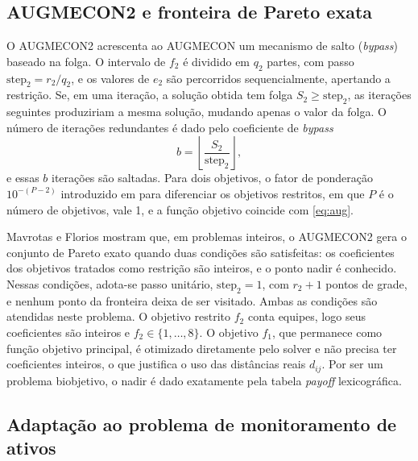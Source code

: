 \documentclass[conference]{IEEEtran}
\begin{document}
\subsection{AUGMECON2 e fronteira de Pareto exata}
\label{sec:augmecon2}

O AUGMECON2 \cite{mavrotas2013} acrescenta ao AUGMECON um mecanismo de salto (\textit{bypass}) baseado na folga. O intervalo de $f_2$ é dividido em $q_2$ partes, com passo $\text{step}_2 = r_2/q_2$, e os valores de $e_2$ são percorridos sequencialmente, apertando a restrição. Se, em uma iteração, a solução obtida tem folga $S_2 \ge \text{step}_2$, as iterações seguintes produziriam a mesma solução, mudando apenas o valor da folga. O número de iterações redundantes é dado pelo coeficiente de \textit{bypass}
\begin{equation}
b = \left\lfloor \frac{S_2}{\text{step}_2} \right\rfloor,
\label{eq:bypass}
\end{equation}
e essas $b$ iterações são saltadas. Para dois objetivos, o fator de ponderação $10^{-(P-2)}$ introduzido em \cite{mavrotas2013} para diferenciar os objetivos restritos, em que $P$ é o número de objetivos, vale 1, e a função objetivo coincide com \eqref{eq:aug}.

Mavrotas e Florios \cite{mavrotas2013} mostram que, em problemas inteiros, o AUGMECON2 gera o conjunto de Pareto exato quando duas condições são satisfeitas: os coeficientes dos objetivos tratados como restrição são inteiros, e o ponto nadir é conhecido. Nessas condições, adota-se passo unitário, $\text{step}_2 = 1$, com $r_2 + 1$ pontos de grade, e nenhum ponto da fronteira deixa de ser visitado. Ambas as condições são atendidas neste problema. O objetivo restrito $f_2$ conta equipes, logo seus coeficientes são inteiros e $f_2 \in \{1,\dots,8\}$. O objetivo $f_1$, que permanece como função objetivo principal, é otimizado diretamente pelo solver e não precisa ter coeficientes inteiros, o que justifica o uso das distâncias reais $d_{ij}$. Por ser um problema biobjetivo, o nadir é dado exatamente pela tabela \textit{payoff} lexicográfica.

\subsection{Adaptação ao problema de monitoramento de ativos}
\end{document}
